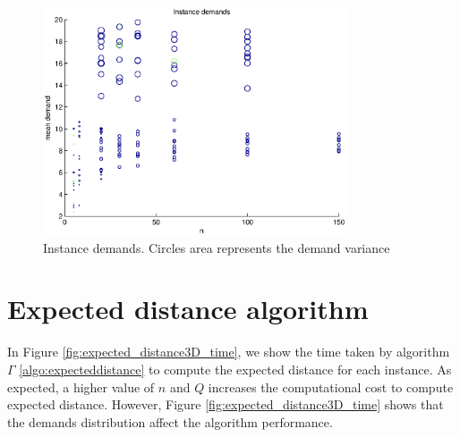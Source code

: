 \begin{figure}[!htbp]
  \begin{center}
   \includegraphics[width=0.8\textwidth]{Images/Chapter5/demands.eps}
  \end{center}
    \caption{Instance demands. Circles area represents the demand variance}\label{fig:demands}
\end{figure}

\section{Expected distance algorithm}\label{sec:test_expecteddistance}


In Figure \ref{fig:expected_distance3D_time}, we show the time taken by algorithm $\Gamma$ \ref{algo:expecteddistance} to compute the expected distance for each instance. As expected, a higher value of $n$ and $Q$ increases the computational cost to compute expected distance. However, Figure \ref{fig:expected_distance3D_time} shows that the demands distribution affect the algorithm performance.

